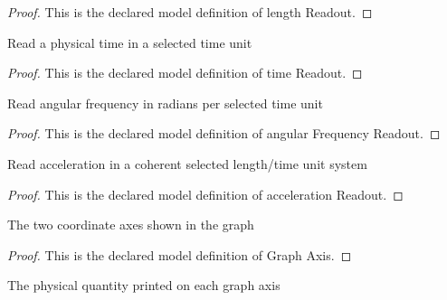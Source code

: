 \begin{proof}
  This is the declared model definition of length Readout.
\end{proof}
\begin{definition}
  \label{def:physics:phyx-mini-0230:phyxminiproblems-problemphyxmini0230-timereadout}
  Read a physical time in a selected time unit
\end{definition}
\begin{proof}
  This is the declared model definition of time Readout.
\end{proof}
\begin{definition}
  \label{def:physics:phyx-mini-0230:phyxminiproblems-problemphyxmini0230-angularfrequencyreadout}
  Read angular frequency in radians per selected time unit
\end{definition}
\begin{proof}
  This is the declared model definition of angular Frequency Readout.
\end{proof}
\begin{definition}
  \label{def:physics:phyx-mini-0230:phyxminiproblems-problemphyxmini0230-accelerationreadout}
  Read acceleration in a coherent selected length/time unit system
\end{definition}
\begin{proof}
  This is the declared model definition of acceleration Readout.
\end{proof}
\begin{definition}
  \label{def:physics:phyx-mini-0230:phyxminiproblems-problemphyxmini0230-graphaxis}
  The two coordinate axes shown in the graph
\end{definition}
\begin{proof}
  This is the declared model definition of Graph Axis.
\end{proof}
\begin{definition}
  \label{def:physics:phyx-mini-0230:phyxminiproblems-problemphyxmini0230-axisquantity}
  The physical quantity printed on each graph axis
\end{definition}
